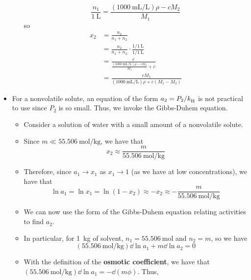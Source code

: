 \documentclass[../notes.tex]{subfiles}
\begin{document}
\begin{itemize}
\begin{itemize}
        \begin{equation*}
            \frac{n_1}{\SI{1}{\liter}} = \frac{(\SI{1000}{\milli\liter\per\liter})\rho-cM_2}{M_1}
        \end{equation*}
        so
        \begin{align*}
            x_2 &= \frac{n_2}{n_1+n_2}\\
            &= \frac{n_2}{n_1+n_2}\cdot\frac{1/\SI{1}{\liter}}{1/\SI{1}{\liter}}\\
            &= \frac{c}{\frac{(\SI{1000}{\milli\liter\per\liter})\rho-cM_2}{M_1}+c}\\
            &= \frac{cM_1}{(\SI{1000}{\milli\liter\per\liter})\rho+c(M_1-M_2)}
        \end{align*}
    \end{itemize}
    \item For a nonvolatile solute, an equation of the form $a_2=P_2/{k_\text{H}^{}}$ is not practical to use since $P_2$ is so small. Thus, we invoke the Gibbs-Duhem equation.
    \begin{itemize}
        \item Consider a solution of water with a small amount of a nonvolatile solute.
        \item Since $m\ll\SI{55.506}{\mole\per\kilo\gram}$, we have that
        \begin{equation*}
            x_2 \approx \frac{m}{\SI{55.506}{\mole\per\kilo\gram}}
        \end{equation*}
        \item Therefore, since $a_1\to x_1$ as $x_1\to 1$ (as we have at low concentrations), we have that
        \begin{equation*}
            \ln a_1 = \ln x_1
            = \ln(1-x_2)
            \approx -x_2
            \approx -\frac{m}{\SI{55.506}{\mole\per\kilo\gram}}
        \end{equation*}
        \item We can now use the form of the Gibbs-Duhem equation relating activities to find $a_2$.
        \item In particular, for \SI{1}{\kilo\gram} of solvent, $n_1=\SI{55.506}{\mole}$ and $n_2=m$, so we have
        \begin{equation*}
            (\SI{55.506}{\mole\per\kilo\gram})\dd{\ln a_1}+m\dd{\ln a_2} = 0
        \end{equation*}
        \item With the definition of the \textbf{osmotic coefficient}, we have that $(\SI{55.506}{\mole\per\kilo\gram})\dd{\ln a_1}=-\dd{(m\phi)}$. Thus,

\end{itemize}
\end{itemize}
\end{document}
